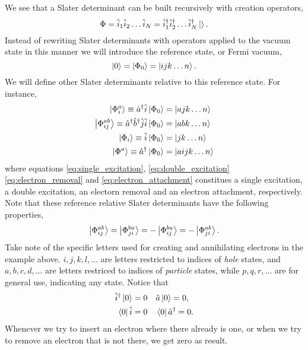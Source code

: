 		We see that a Slater determinant can be built recursively with creation operators,
		\begin{equation}
			\Phi = \hat{i}_1\hat{i}_2\dots \hat{i}_N 
				= \hat{i}_1^\dagger \hat{i}_2^\dagger \dots \hat{i}_N^\dagger\ket{}.
		\end{equation}
		Instead of rewriting Slater determinants with operators applied to the vacuum 
		state in this manner we will introduce the reference state, or 
		Fermi vacuum,
		\begin{equation}
			\ket{0} = \ket{\Phi_0} = \ket{ijk\dots n}. 
		\end{equation}
		We will define other Slater determinants relative to this reference state.
		For instance,
		\begin{align}
		\label{eq:single_excitation}
		\ket{\Phi^a_i} \equiv \hat{a}^\dagger \hat{i}\ket{\Phi_0} &= \ket{ajk\dots n} \\
		\label{eq:double_excitation}
		\ket{\Phi^{ab}_{ij}} \equiv \hat{a}^\dagger\hat{b}^\dagger \hat{j} \hat{i}\ket{\Phi_0}
			&= \ket{abk\dots n} \\
		\label{eq:electron_removal}
		\ket{\Phi_i} \equiv \hat{i}\ket{\Phi_0} &= \ket{jk\dots n} \\
		\label{eq:electron_attachment}
		\ket{\Phi^a} \equiv \hat{a}^\dagger \ket{\Phi_0} &= \ket{aijk\dots n}
		\end{align}
		where equations \ref{eq:single_excitation}, \ref{eq:double_excitation}
		\ref{eq:electron_removal} and \ref{eq:electron_attachment}
		constitues a single excitation, a double excitation, an electorn removal and an
		electron attachment, respectively. Note that these reference relative Slater 
		determinants have the following properties,
		\begin{equation}
			\ket{\Phi^{ab}_{ij}} = \ket{\Phi^{ba}_{ji}}
				= - \ket{\Phi^{ba}_{ij}} = - \ket{\Phi^{ab}_{ji}}.
		\end{equation}
		Take note of the specific letters used for creating and annihilating electrons 
		in the example above. $i,j,k,l,\dots$ are letters restricted to indices of 
		\emph{hole} states, and $a,b,c,d,\dots$ are letters restriced to indices of
		\emph{particle} states, while $p,q,r,\dots$ are for general use, indicating 
		any state. Notice that
		\begin{equation}
			\begin{aligned}
				\hat{i}^\dagger\ket{0} = 0 &\quad \hat{a}\ket{0} = 0, \\
				\bra{0}\hat{i} = 0 &\quad \bra{0}\hat{a}^\dagger = 0.
			\end{aligned}	
		\end{equation}
		Whenever we try to insert an electron where there already is one, or when we 
		try to remove an electron that is not there, we get zero as result.

